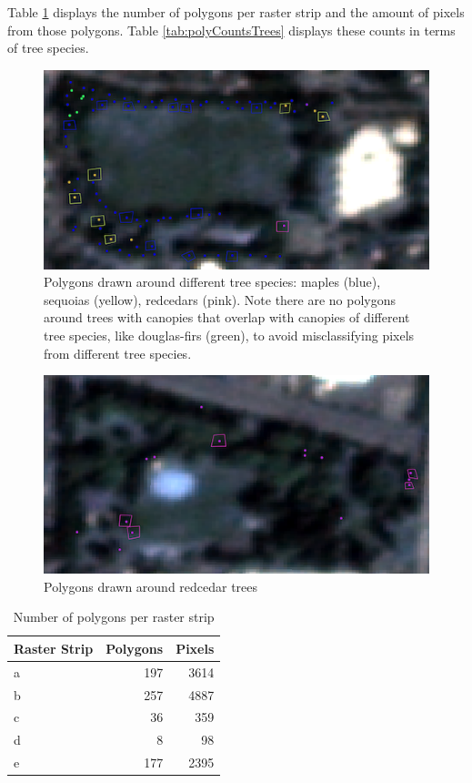 \documentclass[12pt,twoside]{reedthesis}
\begin{document}
Table \ref{tab:polyCounts} displays the number of polygons per raster strip and the amount of pixels from those polygons. Table \ref{tab:polyCountsTrees} displays these counts in terms of tree species.
\begin{figure}

{\centering \includegraphics[width=0.5\linewidth]{figure/polyimage} 

}

\caption{Polygons drawn around different tree species: maples (blue), sequoias (yellow), redcedars (pink). Note there are no polygons around trees with canopies that overlap with canopies of different tree species, like douglas-firs (green), to avoid misclassifying pixels from different tree species.}\label{fig:polyimage}
\end{figure}
\begin{figure}

{\centering \includegraphics[width=0.5\linewidth]{figure/redcedar} 

}

\caption{Polygons drawn around redcedar trees}\label{fig:redcedar}
\end{figure}
\begin{table}

\caption{\label{tab:polyCounts}Number of polygons per raster strip}
\centering
\begin{tabular}[t]{l|r|r}
\hline
Raster Strip & Polygons & Pixels\\
\hline
a & 197 & 3614\\
\hline
b & 257 & 4887\\
\hline
c & 36 & 359\\
\hline
d & 8 & 98\\
\hline
e & 177 & 2395\\
\hline
\end{tabular}
\end{table}
\end{document}

